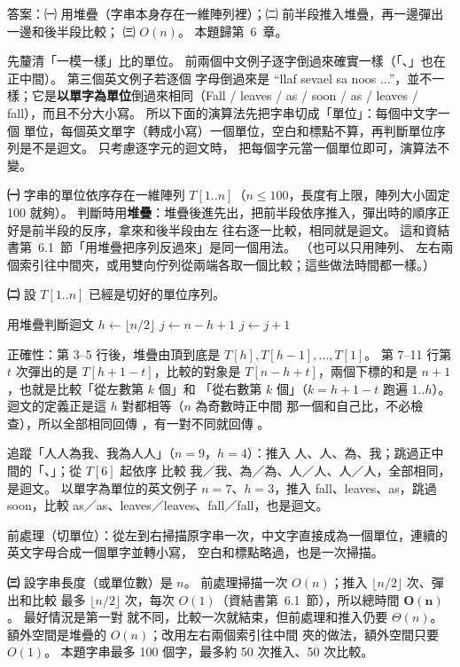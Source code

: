 \begin{pastsoln}
答案：㈠ 用堆疊（字串本身存在一維陣列裡）；㈡ 前半段推入堆疊，再一邊彈出一邊和後半段比較；
㈢ $O(n)$。 本題歸第~6~章。

先釐清「一模一樣」比的單位。 前兩個中文例子逐字倒過來確實一樣（「、」也在正中間）。 第三個英文例子若逐個
字母倒過來是 “llaf sevael sa noos ...”，並不一樣；它是\textbf{以單字為單位}倒過來相同（Fall / leaves /
as / soon / as / leaves / fall），而且不分大小寫。 所以下面的演算法先把字串切成「單位」：每個中文字一個
單位，每個英文單字（轉成小寫）一個單位，空白和標點不算，再判斷單位序列是不是迴文。 只考慮逐字元的迴文時，
把每個字元當一個單位即可，演算法不變。

\textbf{㈠} 字串的單位依序存在一維陣列 $T[1..n]$（$n \le 100$，長度有上限，陣列大小固定 100 就夠）。
判斷時用\textbf{堆疊}：堆疊後進先出，把前半段依序推入，彈出時的順序正好是前半段的反序，拿來和後半段由左
往右逐一比較，相同就是迴文。 這和資結書第~6.1~節「用堆疊把序列反過來」是同一個用法。 （也可以只用陣列、
左右兩個索引往中間夾，或用雙向佇列從兩端各取一個比較；這些做法時間都一樣。）

\textbf{㈡} 設 $T[1..n]$ 已經是切好的單位序列。
\begin{pseudo}[unbreakable]{用堆疊判斷迴文}
    \State {}
    \State $h \gets \lfloor n/2 \rfloor$
        \State {} 
    \EndFor
    \State $j \gets n - h + 1$ 
        \State {}
            \State \Return \FALSE
        \EndIf
        \State $j \gets j + 1$
    \EndWhile
    \State \Return \TRUE
\EndFunction
\end{pseudo}
正確性：第 3--5 行後，堆疊由頂到底是 $T[h], T[h-1], \ldots, T[1]$。 第 7--11 行第 $t$ 次彈出的是
$T[h + 1 - t]$，比較的對象是 $T[n - h + t]$，兩個下標的和是 $n + 1$，也就是比較「從左數第 $k$ 個」和
「從右數第 $k$ 個」（$k = h + 1 - t$ 跑遍 $1..h$）。 迴文的定義正是這 $h$ 對都相等（$n$ 為奇數時正中間
那一個和自己比，不必檢查），所以全部相同回傳 \TRUE，有一對不同就回傳 \FALSE。

追蹤「人人為我、我為人人」（$n = 9$，$h = 4$）：推入 人、人、為、我；跳過正中間的「、」；從 $T[6]$ 起依序
比較 我／我、為／為、人／人、人／人，全部相同，是迴文。 以單字為單位的英文例子 $n = 7$、$h = 3$，推入
fall、leaves、as，跳過 soon，比較 as／as、leaves／leaves、fall／fall，也是迴文。

前處理（切單位）：從左到右掃描原字串一次，中文字直接成為一個單位，連續的英文字母合成一個單字並轉小寫，
空白和標點略過，也是一次掃描。

\textbf{㈢} 設字串長度（或單位數）是 $n$。 前處理掃描一次 $O(n)$；推入 $\lfloor n/2 \rfloor$ 次、彈出和比較
最多 $\lfloor n/2 \rfloor$ 次，每次 $O(1)$（資結書第~6.1~節），所以總時間 $\mathbf{O(n)}$。 最好情況是第一對
就不同，比較一次就結束，但前處理和推入仍要 $\Theta(n)$。 額外空間是堆疊的 $O(n)$；改用左右兩個索引往中間
夾的做法，額外空間只要 $O(1)$。 本題字串最多 100 個字，最多約 50 次推入、50 次比較。
\end{pastsoln}

